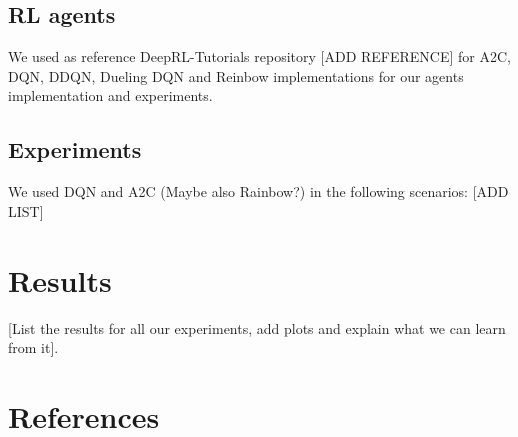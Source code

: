 \documentclass[11 pt, twocolumn]{article}
\begin{document}
\subsection{RL agents}
We used as reference DeepRL-Tutorials repository [ADD REFERENCE] for A2C, DQN, DDQN, Dueling DQN and Reinbow implementations for our agents implementation and experiments.

\subsection{Experiments}
We used DQN and A2C (Maybe also Rainbow?) in the following scenarios: [ADD LIST]

\section{Results}
[List the results for all our experiments, add plots and explain what we can learn from it].


\section{References}
\end{document}
